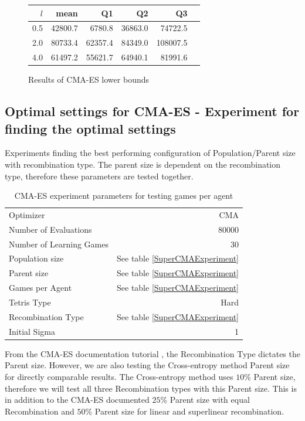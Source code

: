 \begin{figure}[H]
\centering
\begin{tabular}{r | r r r r r}
$l$ & mean & Q1 & Q2 & Q3\\
\hline
0.5 & 42800.7 & 6780.8  & 36863.0 & 74722.5\\
2.0 & 80733.4 & 62357.4 & 84349.0 & 108007.5\\
4.0 & 61497.2 & 55621.7 & 64940.1 & 81991.6\\
\end{tabular}
\caption{Results of CMA-ES lower bounds \label{appendixCMALowerBoundConfigTest}}
\end{figure}





\clearpage

\subsection{Optimal settings for CMA-ES - Experiment for finding the optimal settings \label{appendixCMAPopulationParent}}
Experiments finding the best performing configuration of Population/Parent size with
recombination type. The parent size is dependent on the recombination type, 
therefore these parameters are tested together.
\begin{table}[h]
\centering
\begin{tabular}{l r}
Optimizer & CMA\\
Number of Evaluations & 80000\\
Number of Learning Games &30\\
Population size& See table \ref{SuperCMAExperiment}\\
Parent size & See table \ref{SuperCMAExperiment}\\
Games per Agent & See table \ref{SuperCMAExperiment}\\
Tetris Type & Hard\\
\hline
Recombination Type & See table \ref{SuperCMAExperiment}\\
Initial Sigma & 1
\end{tabular}
\caption{CMA-ES experiment parameters for testing games per agent}
\end{table}

From the CMA-ES documentation tutorial \citep{hansen2011}, the Recombination Type dictates the Parent size.
However, we are also testing the Cross-entropy method Parent size for directly comparable
results. The Cross-entropy method uses $10 \% $ Parent size, therefore we will test all 
three Recombination types with this Parent size. This is in addition to the CMA-ES
documented $25 \% $ Parent size with equal Recombination and $50 \% $ Parent size for 
linear and superlinear recombination.

